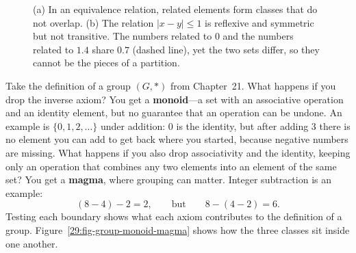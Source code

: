 \begin{figure}[htbp]
\caption{(a) In an equivalence relation, related elements form classes that do not overlap. (b) The relation $|x - y| \le 1$ is reflexive and symmetric but not transitive. The numbers related to $0$ and the numbers related to $1.4$ share $0.7$ (dashed line), yet the two sets differ, so they cannot be the pieces of a partition.}
\label{29:fig-tolerance}
\end{figure}

\begin{labbox}
Take the definition of a group $(G, *)$ from Chapter~21. What happens if you drop the inverse axiom? You get a \textbf{monoid}---a set with an associative operation and an identity element, but no guarantee that an operation can be undone. An example is $\{0, 1, 2, \ldots\}$ under addition: $0$ is the identity, but after adding $3$ there is no element you can add to get back where you started, because negative numbers are missing. What happens if you also drop associativity and the identity, keeping only an operation that combines any two elements into an element of the same set? You get a \textbf{magma}, where grouping can matter. Integer subtraction is an example:
\[
(8 - 4) - 2 = 2, \qquad \text{but} \qquad 8 - (4 - 2) = 6.
\]
Testing each boundary shows what each axiom contributes to the definition of a group. Figure~\ref{29:fig-group-monoid-magma} shows how the three classes sit inside one another.
\end{labbox}

